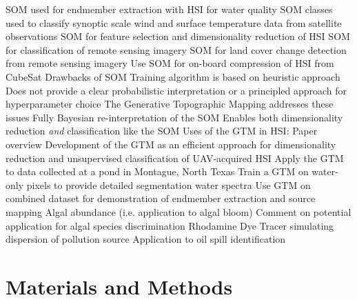 \documentclass{article}
\begin{document}
\begin{outline}[enumerate]
            \4 SOM used for endmember extraction with HSI for water quality \cite{cantero2004analysis}
            \4 SOM classes used to classify synoptic scale wind and surface temperature data from satellite observations \cite{som-satellite}
            \4 SOM for feature selection and dimensionality reduction of HSI \cite{som-hsi}
            \4 SOM for classification of remote sensing imagery \cite{msom-remote-sensing}
            \4 SOM for land cover change detection from remote sensing imagery \cite{penfound2021analysis}
            \4 Use SOM for on-board compression of HSI from CubeSat \cite{danielsen2021self}
    \2 Drawbacks of SOM
        \3 Training algorithm is based on heuristic approach
        \3 Does not provide a clear probabilistic interpretation or a principled approach for hyperparameter choice
    \2 The Generative Topographic Mapping addresses these issues
        \3 Fully Bayesian re-interpretation of the SOM \cite{gtm-bishop-1, gtm-bishop-2}
        \3 Enables both dimensionality reduction \textit{and} classification like the SOM
        \3 Uses of the GTM in HSI:
\1 Paper overview
    \2 Development of the GTM as an efficient approach for dimensionality reduction and unsupervised classification of UAV-acquired HSI
    \2 Apply the GTM to data collected at a pond in Montague, North Texas
    \2 Train a GTM on water-only pixels to provide detailed segmentation water spectra
    \2 Use GTM on combined dataset for demonstration of endmember extraction and source mapping
        \3 Algal abundance (i.e. application to algal bloom)
            \4 Comment on potential application for algal species discrimination
        \3 Rhodamine Dye Tracer simulating dispersion of pollution source
            \4 Application to oil spill identification
        
\end{outline}
    
\section*{Materials and Methods}
\end{document}
